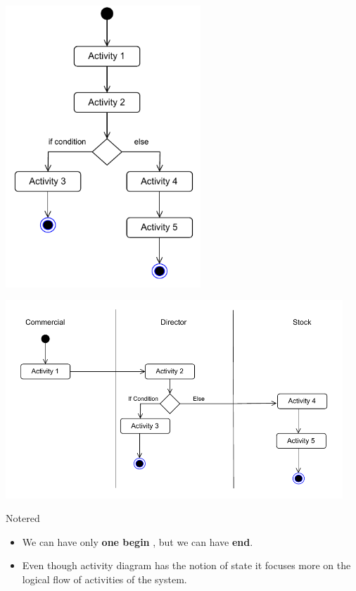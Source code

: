 \vspace{0.25cm}

\begin{center}
\includegraphics[width=0.55\textwidth,height=0.6\textheight]{Chapters/Diagram/AC/ac1.drawio.pdf}
\end{center}

\begin{center}
\includegraphics[width=0.95\textwidth,height=0.65\textheight]{Chapters/Diagram/AC/ac2.drawio.pdf}
\end{center}



\vspace{0.25cm}

\begin{prettyBox}{Note}{red}
\begin{itemize}
    \item We can have only \textbf{one begin} , but we can have \textbf{end}.
    \item Even though activity diagram has the notion of state it focuses more on the 
    logical flow of activities of the system.
\end{itemize}
\end{prettyBox}


